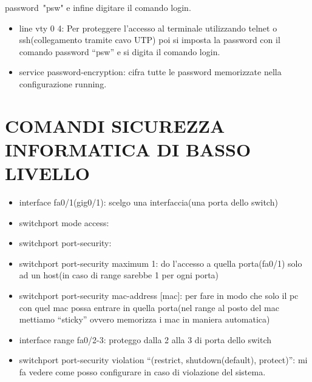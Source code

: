 \documentclass[
]{article}
\providecommand{\tightlist}{%
  \setlength{\itemsep}{0pt}\setlength{\parskip}{0pt}}
\begin{document}
{password}{~}{"psw" e infine digitare il comando }{login}{.}

\begin{itemize}
\tightlist
\item
  {line vty 0 4}{: Per proteggere l'accesso al terminale utilizzando
  telnet o ssh(collegamento tramite cavo UTP) poi si imposta la password
  con il comando password ``psw'' e si digita il comando }{login}{.}
\item
  {service password-encryption}{: cifra tutte le password memorizzate
  nella configurazione running.}
\end{itemize}

{}

{}

\section{\texorpdfstring{{COMANDI SICUREZZA INFORMATICA DI BASSO
LIVELLO}}{COMANDI SICUREZZA INFORMATICA DI BASSO LIVELLO}}\label{h.l8ek275b5ycb}

\begin{itemize}
\tightlist
\item
  {interface fa0/1}{(gig0/1): scelgo una interfaccia(una porta dello
  switch)}
\item
  {switchport mode access}{: }
\item
  {switchport port-security}{:}
\item
  {switchport port-security maximum 1}{: do l'accesso a quella
  porta(fa0/1) solo ad un host(in caso di range sarebbe 1 per ogni
  porta)}
\item
  {switchport port-security mac-address {[}}{mac{]}}{: per fare in modo
  che solo il pc con quel mac possa entrare in quella porta(nel range al
  posto del mac mettiamo ``sticky'' ovvero memorizza i mac in maniera
  automatica)}
\item
  {interface range fa0/2-3}{: proteggo dalla 2 alla 3 di porta dello
  switch}
\item
  {switchport port-security violation }{``(restrict, shutdown(default),
  protect)''}{: mi fa vedere come posso configurare in caso di
  violazione del sistema.}
\end{itemize}

{}

{}

\section{\texorpdfstring{{}}{}}\label{h.8g4h9btxc5h0}
\end{document}
